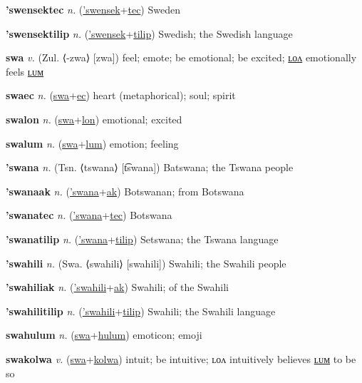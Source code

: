 \textbf{\hypertarget{'swensektec}{'swensektec}} \textit{n.} (\hyperlink{'swensek}{'swensek}+\allowbreak \hyperlink{tec}{tec})
Sweden

\textbf{\hypertarget{'swensektilip}{'swensektilip}} \textit{n.} (\hyperlink{'swensek}{'swensek}+\allowbreak \hyperlink{tilip}{tilip})
Swedish; the Swedish language

\textbf{\hypertarget{swa}{swa}} \textit{v.} (Zul. ⟨-zwa⟩ [zwa])
feel; emote; be emotional; be excited; \hyperlink{swalon}{ʟᴏᴧ} emotionally feels \hyperlink{swalum}{ʟᴜᴍ}

\textbf{\hypertarget{swaec}{swaec}} \textit{n.} (\hyperlink{swa}{swa}+\allowbreak \hyperlink{ec}{ec})
heart (metaphorical); soul; spirit

\textbf{\hypertarget{swalon}{swalon}} \textit{n.} (\hyperlink{swa}{swa}+\allowbreak \hyperlink{lon}{lon})
emotional; excited

\textbf{\hypertarget{swalum}{swalum}} \textit{n.} (\hyperlink{swa}{swa}+\allowbreak \hyperlink{lum}{lum})
emotion; feeling

\textbf{\hypertarget{'swana}{'swana}} \textit{n.} (Tsn. ⟨tswana⟩ [t͡swana])
Batswana; the Tswana people

\textbf{\hypertarget{'swanaak}{'swanaak}} \textit{n.} (\hyperlink{'swana}{'swana}+\allowbreak \hyperlink{ak}{ak})
Botswanan; from Botswana

\textbf{\hypertarget{'swanatec}{'swanatec}} \textit{n.} (\hyperlink{'swana}{'swana}+\allowbreak \hyperlink{tec}{tec})
Botswana

\textbf{\hypertarget{'swanatilip}{'swanatilip}} \textit{n.} (\hyperlink{'swana}{'swana}+\allowbreak \hyperlink{tilip}{tilip})
Setswana; the Tswana language

\textbf{\hypertarget{'swahili}{'swahili}} \textit{n.} (Swa. ⟨swahili⟩ [swahili])
Swahili; the Swahili people

\textbf{\hypertarget{'swahiliak}{'swahiliak}} \textit{n.} (\hyperlink{'swahili}{'swahili}+\allowbreak \hyperlink{ak}{ak})
Swahili; of the Swahili

\textbf{\hypertarget{'swahilitilip}{'swahilitilip}} \textit{n.} (\hyperlink{'swahili}{'swahili}+\allowbreak \hyperlink{tilip}{tilip})
Swahili; the Swahili language

\textbf{\hypertarget{swahulum}{swahulum}} \textit{n.} (\hyperlink{swa}{swa}+\allowbreak \hyperlink{hulum}{hulum})
emoticon; emoji

\textbf{\hypertarget{swakolwa}{swakolwa}} \textit{v.} (\hyperlink{swa}{swa}+\allowbreak \hyperlink{kolwa}{kolwa})
intuit; be intuitive; ʟᴏᴧ intuitively believes \hyperlink{swakolwalum}{ʟᴜᴍ} to be so

